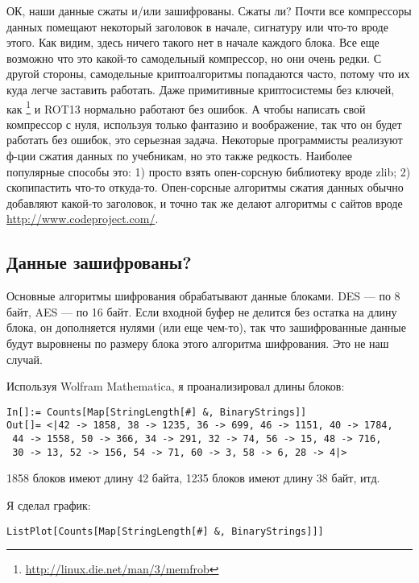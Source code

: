 ОК, наши данные сжаты и/или зашифрованы.
Сжаты ли? Почти все компрессоры данных помещают некоторый заголовок в начале, сигнатуру или что-то вроде этого.
Как видим, здесь ничего такого нет в начале каждого блока.
Все еще возможно что это какой-то самодельный компрессор, но они очень редки.
С другой стороны, самодельные криптоалгоритмы попадаются часто, потому что их куда легче заставить работать.
Даже примитивные криптосистемы без ключей, как \footnote{\url{http://linux.die.net/man/3/memfrob}}
и ROT13 нормально работают без ошибок.
А чтобы написать свой компрессор с нуля, используя только фантазию и воображение, так что он будет работать без ошибок,
это серьезная задача.
Некоторые программисты реализуют ф-ции сжатия данных по учебникам, но это также редкость.
Наиболее популярные способы это:
1) просто взять опен-сорсную библиотеку вроде zlib;
2) скопипастить что-то откуда-то.
Опен-сорсные алгоритмы сжатия данных обычно добавляют какой-то заголовок, и точно так же делают алгоритмы с сайтов вроде
\url{http://www.codeproject.com/}.

\subsection{Данные зашифрованы?}

Основные алгоритмы шифрования обрабатывают данные блоками. DES --- по 8 байт, AES --- по 16 байт.
Если входной буфер не делится без остатка на длину блока, он дополняется нулями (или еще чем-то), так что зашифрованные
данные будут выровнены по размеру блока этого алгоритма шифрования.
Это не наш случай.

Используя Wolfram Mathematica, я проанализировал длины блоков:

\begin{lstlisting}
In[]:= Counts[Map[StringLength[#] &, BinaryStrings]]
Out[]= <|42 -> 1858, 38 -> 1235, 36 -> 699, 46 -> 1151, 40 -> 1784,
 44 -> 1558, 50 -> 366, 34 -> 291, 32 -> 74, 56 -> 15, 48 -> 716,
 30 -> 13, 52 -> 156, 54 -> 71, 60 -> 3, 58 -> 6, 28 -> 4|>
\end{lstlisting}

1858 блоков имеют длину 42 байта, 1235 блоков имеют длину 38 байт, итд.

Я сделал график:

\begin{lstlisting}
ListPlot[Counts[Map[StringLength[#] &, BinaryStrings]]]
\end{lstlisting}

